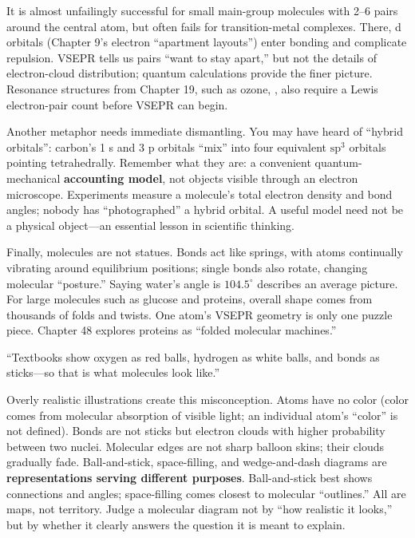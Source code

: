It is almost unfailingly successful for small main-group molecules with 2--6 pairs around the central atom, but often fails for transition-metal complexes. There, d orbitals (Chapter 9's electron ``apartment layouts'') enter bonding and complicate repulsion. VSEPR tells us pairs ``want to stay apart,'' but not the details of electron-cloud distribution; quantum calculations provide the finer picture. Resonance structures from Chapter 19, such as ozone, , also require a Lewis electron-pair count before VSEPR can begin.

Another metaphor needs immediate dismantling. You may have heard of ``hybrid orbitals'': carbon's 1 s and 3 p orbitals ``mix'' into four equivalent $\mathrm{sp^3}$ orbitals pointing tetrahedrally. Remember what they are: a convenient quantum-mechanical \textbf{accounting model}, not objects visible through an electron microscope. Experiments measure a molecule's total electron density and bond angles; nobody has ``photographed'' a hybrid orbital. A useful model need not be a physical object---an essential lesson in scientific thinking.

Finally, molecules are not statues. Bonds act like springs, with atoms continually vibrating around equilibrium positions; single bonds also rotate, changing molecular ``posture.'' Saying water's angle is $104.5^{\circ}$ describes an average picture. For large molecules such as glucose and proteins, overall shape comes from thousands of folds and twists. One atom's VSEPR geometry is only one puzzle piece. Chapter 48 explores proteins as ``folded molecular machines.''

\begin{wuqu}
``Textbooks show oxygen as red balls, hydrogen as white balls, and bonds as sticks---so that is what molecules look like.''

Overly realistic illustrations create this misconception. Atoms have no color (color comes from molecular absorption of visible light; an individual atom's ``color'' is not defined). Bonds are not sticks but electron clouds with higher probability between two nuclei. Molecular edges are not sharp balloon skins; their clouds gradually fade. Ball-and-stick, space-filling, and wedge-and-dash diagrams are \textbf{representations serving different purposes}. Ball-and-stick best shows connections and angles; space-filling comes closest to molecular ``outlines.'' All are maps, not territory. Judge a molecular diagram not by ``how realistic it looks,'' but by whether it clearly answers the question it is meant to explain.
\end{wuqu}


